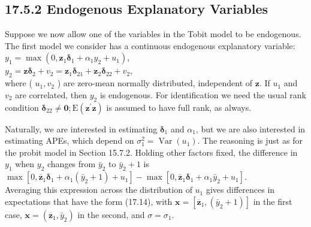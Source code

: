 \documentclass[10pt]{article}
\begin{document}
\subsection*{17.5.2 Endogenous Explanatory Variables}
Suppose we now allow one of the variables in the Tobit model to be endogenous. The first model we consider has a continuous endogenous explanatory variable:\\
$y_{1}=\max \left(0, \mathbf{z}_{1} \boldsymbol{\delta}_{1}+\alpha_{1} y_{2}+u_{1}\right)$,\\
$y_{2}=\mathbf{z} \boldsymbol{\delta}_{2}+v_{2}=\mathbf{z}_{1} \boldsymbol{\delta}_{21}+\mathbf{z}_{2} \boldsymbol{\delta}_{22}+v_{2}$,\\
where ( $u_{1}, v_{2}$ ) are zero-mean normally distributed, independent of $\mathbf{z}$. If $u_{1}$ and $v_{2}$ are correlated, then $y_{2}$ is endogenous. For identification we need the usual rank condition $\boldsymbol{\delta}_{22} \neq \mathbf{0} ; \mathrm{E}\left(\mathbf{z}^{\prime} \mathbf{z}\right)$ is assumed to have full rank, as always.

Naturally, we are interested in estimating $\boldsymbol{\delta}_{1}$ and $\alpha_{1}$, but we are also interested in estimating APEs, which depend on $\sigma_{1}^{2}=\operatorname{Var}\left(u_{1}\right)$. The reasoning is just as for the probit model in Section 15.7.2. Holding other factors fixed, the difference in $y_{1}$ when $y_{2}$ changes from $\bar{y}_{2}$ to $\bar{y}_{2}+1$ is\\
$\max \left[0, \overline{\mathbf{z}}_{1} \boldsymbol{\delta}_{1}+\alpha_{1}\left(\bar{y}_{2}+1\right)+u_{1}\right]-\max \left[0, \overline{\mathbf{z}}_{1} \boldsymbol{\delta}_{1}+\alpha_{1} \bar{y}_{2}+u_{1}\right]$.\\
Averaging this expression across the distribution of $u_{1}$ gives differences in expectations that have the form (17.14), with $\mathbf{x}=\left[\overline{\mathbf{z}}_{1},\left(\bar{y}_{2}+1\right)\right]$ in the first case, $\mathbf{x}=\left(\overline{\mathbf{z}}_{1}, \bar{y}_{2}\right)$ in the second, and $\sigma=\sigma_{1}$.
\end{document}
